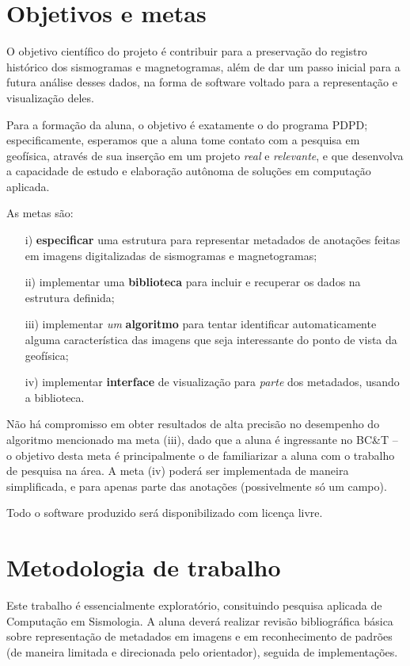 \documentclass{article}
\begin{document}
\section{Objetivos e metas}

O objetivo científico do projeto é contribuir para a preservação do
registro histórico dos sismogramas e magnetogramas, além de
dar um passo inicial para a futura análise desses dados, na forma de
software voltado para a representação e visualização deles.

Para a formação da aluna, o objetivo é exatamente o do programa PDPD;
especificamente, esperamos que a aluna tome contato com a pesquisa
em geofísica, através de sua inserção em um projeto {\em real} e
{\em relevante}, e que desenvolva a capacidade de estudo e elaboração
autônoma de soluções em computação aplicada.

As metas são:
\begin{itemize}
\item[i) ] {\bf especificar} uma estrutura para representar metadados de anotações feitas em imagens digitalizadas
  de sismogramas e magnetogramas;
\item[ii) ] implementar uma {\bf biblioteca} para incluir e recuperar os
  dados na estrutura definida;
\item[iii) ] implementar {\em um} {\bf algoritmo} para tentar identificar
  automaticamente alguma característica das imagens que seja
  interessante do ponto de vista da geofísica;
\item[iv) ] implementar {\bf interface} de visualização para {\em parte}
  dos metadados, usando a biblioteca.
\end{itemize}

Não há compromisso em obter resultados de alta precisão no desempenho
do algoritmo mencionado ma meta (iii), dado que a aluna é ingressante
no BC\&T -- o objetivo desta meta é principalmente o de familiarizar
a aluna com o trabalho de pesquisa na área.
A meta (iv) poderá ser implementada de maneira simplificada, e para
apenas parte das anotações (possivelmente só um campo).

Todo o software produzido será disponibilizado com licença livre.

\section{Metodologia de trabalho}

Este trabalho é essencialmente exploratório, consituindo pesquisa
aplicada de Computação em Sismologia. A aluna deverá realizar revisão
bibliográfica básica sobre representação de metadados em imagens e
em reconhecimento de padrões (de maneira limitada e direcionada pelo
orientador), seguida de implementações.
\end{document}

